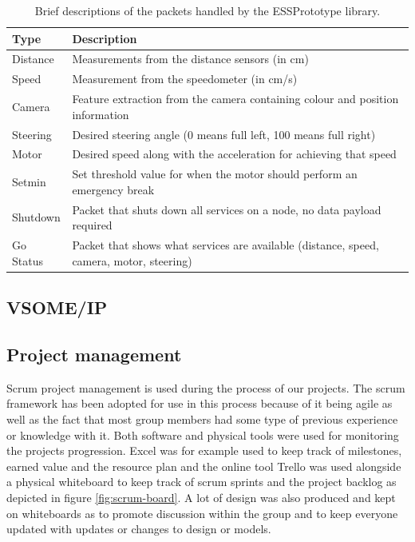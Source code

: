 \documentclass[11pt, titlepage]{article} %
\begin{document}
\begin{table}
  \caption{Brief descriptions of the packets handled by the ESSPrototype library.}
  \label{tab:packets}
  \centering
  \begin{tabular}{|l|l|} \hline
    \textbf{Type} & \textbf{Description}  \\ \hline
    Distance & Measurements from the distance sensors (in cm) \\ \hline
    Speed & Measurement from the speedometer (in cm/s) \\ \hline
    Camera & Feature extraction from the camera containing colour and position information  \\ \hline
    Steering & Desired steering angle (0 means full left, 100 means full right)  \\ \hline
    Motor & Desired speed along with the acceleration for achieving that speed \\ \hline
    Setmin & Set threshold value for when the motor should perform an emergency break  \\ \hline
    Shutdown & Packet that shuts down all services on a node, no data payload required  \\ \hline
    Go Status & Packet that shows what services are available (distance, speed, camera, motor, steering)  \\ \hline
     \end{tabular}
\end{table}

\subsection{VSOME/IP}


\subsection{Project management}
Scrum project management is used during the process of our projects.
The scrum framework has been adopted for use in this process because of it being agile as well as the fact that most group members had some type of previous experience or knowledge with it. Both software and physical tools were used for monitoring the projects progression. Excel was for example used to keep track of milestones, earned value and the resource plan and the online tool Trello was used alongside a physical whiteboard to keep track of scrum sprints and the project backlog as depicted in figure \ref{fig:scrum-board}. A lot of design was also produced and kept on whiteboards as to promote discussion within the group and to keep everyone updated with updates or changes to design or models.
\end{document}
